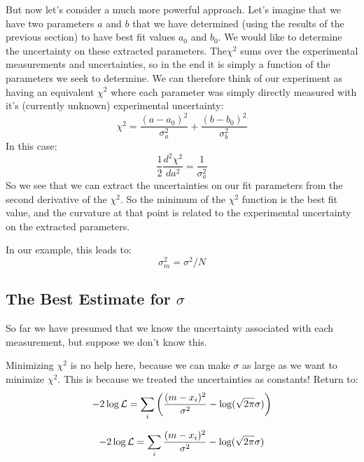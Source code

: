 \documentclass[12pt]{article}
\begin{document}
But now let's consider a much more powerful approach.  Let's imagine that we have two parameters $a$ and $b$ that we have determined (using the results of the previous section) to have best fit values $a_0$ and $b_0$.  We would like to determine the uncertainty on these extracted parameters.  The$\chi^2$ sums over the experimental measurements and uncertainties, so in the end it is simply a function of the parameters we seek to determine.   We can therefore think of our experiment as having an equivalent $\chi^2$ where each parameter was simply directly measured with it's (currently unknown)  experimental uncertainty:
\begin{displaymath}
\chi^2 = \frac{(a - a_0)^2}{\sigma_a^2} + \frac{(b - b_0)^2}{\sigma_b^2} 
\end{displaymath}
In this case:
\begin{displaymath}
\frac{1}{2} \frac{d^2 \chi^2}{da^2} = \frac{1}{\sigma_a^2}
\end{displaymath}
So we see that we can extract the uncertainties on our fit parameters from the second derivative of the $\chi^2$.  So the minimum of the $\chi^2$ function is the best fit value, and the curvature at that point is related to the experimental uncertainty on the extracted parameters.

In our example, this leads to:
\begin{displaymath}
\sigma_m^2 = \sigma^2/N
\end{displaymath}

\subsection{The Best Estimate for $\sigma$}

So far we have presumed that we know the uncertainty associated with each measurement, but suppose we don't know this.

Minimizing $\chi^2$ is no help here, because we can make $\sigma$ as large as we want to minimize $\chi^2$.  This is because we treated the uncertainties as constants!  Return to:
\begin{equation}
-2 \log {\cal L} = \sum_i \left( \frac{(m-x_i)^2}{\sigma^2} - \log(\sqrt{2\pi}\sigma)\right)
\end{equation}

\begin{equation}
-2 \log {\cal L} = \sum_i \frac{(m-x_i)^2}{\sigma^2} - \log(\sqrt{2\pi}\sigma)
\end{equation}
\end{document}

